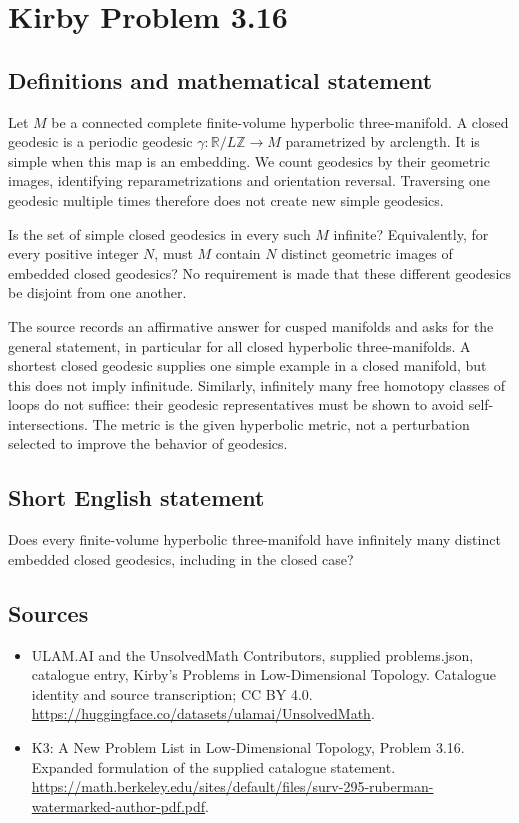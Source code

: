 \documentclass[11pt,a4paper]{article}
\begin{document}
\section*{Kirby Problem 3.16}\label{statement}

\subsection{Definitions and mathematical statement}
Let $M$ be a connected complete finite-volume hyperbolic three-manifold.
A closed geodesic is a periodic geodesic $\gamma:\mathbb R/L\mathbb Z\to M$
parametrized by arclength. It is simple when this map is an embedding.
We count geodesics by their geometric images, identifying reparametrizations
and orientation reversal. Traversing one geodesic multiple times therefore
does not create new simple geodesics.

Is the set of simple closed geodesics in every such $M$ infinite? Equivalently,
for every positive integer $N$, must $M$ contain $N$ distinct geometric
images of embedded closed geodesics? No requirement is made that these
different geodesics be disjoint from one another.

The source records an affirmative answer for cusped manifolds and asks for
the general statement, in particular for all closed hyperbolic three-manifolds.
A shortest closed geodesic supplies one simple example in a closed manifold,
but this does not imply infinitude. Similarly, infinitely many free homotopy
classes of loops do not suffice: their geodesic representatives must be
shown to avoid self-intersections. The metric is the given hyperbolic metric,
not a perturbation selected to improve the behavior of geodesics.
\subsection{Short English statement}
Does every finite-volume hyperbolic three-manifold have infinitely many distinct embedded closed geodesics, including in the closed case?
\subsection{Sources}
\begin{itemize}
\item[S1] ULAM.AI and the UnsolvedMath Contributors, supplied problems.json, catalogue entry, Kirby's Problems in Low-Dimensional Topology. Catalogue identity and source transcription; CC BY 4.0.
\url{https://huggingface.co/datasets/ulamai/UnsolvedMath}.
\item[S2] K3: A New Problem List in Low-Dimensional Topology, Problem 3.16. Expanded formulation of the supplied catalogue statement.
\url{https://math.berkeley.edu/sites/default/files/surv-295-ruberman-watermarked-author-pdf.pdf}.
\end{itemize}
\end{document}
